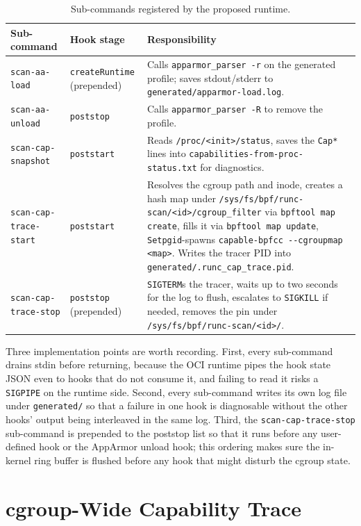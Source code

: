 \begin{table}[ht]
\centering
\caption{Sub-commands registered by the proposed runtime.}
\label{tab:subcmds}
\begin{tabular}{p{3.8cm}p{2.5cm}p{7.8cm}}
\toprule
\textbf{Sub-command} & \textbf{Hook stage} & \textbf{Responsibility} \\
\midrule
\texttt{scan-aa-load} & \texttt{createRuntime} (prepended) & Calls \texttt{apparmor\_parser -r} on the generated profile; saves stdout/stderr to \texttt{generated/apparmor-load.log}. \\
\texttt{scan-aa-unload} & \texttt{poststop} & Calls \texttt{apparmor\_parser -R} to remove the profile. \\
\texttt{scan-cap-snapshot} & \texttt{poststart} & Reads \texttt{/proc/<init>/status}, saves the \texttt{Cap*} lines into \texttt{capabilities-from-proc-status.txt} for diagnostics. \\
\texttt{scan-cap-trace-start} & \texttt{poststart} & Resolves the cgroup path and inode, creates a hash map under \texttt{/sys/fs/bpf/runc-scan/<id>/cgroup\_filter} via \texttt{bpftool map create}, fills it via \texttt{bpftool map update}, \texttt{Setpgid}-spawns \texttt{capable-bpfcc -{}-cgroupmap <map>}. Writes the tracer PID into \texttt{generated/.runc\_cap\_trace.pid}. \\
\texttt{scan-cap-trace-stop} & \texttt{poststop} (prepended) & \texttt{SIGTERM}s the tracer, waits up to two seconds for the log to flush, escalates to \texttt{SIGKILL} if needed, removes the pin under \texttt{/sys/fs/bpf/runc-scan/<id>/}. \\
\bottomrule
\end{tabular}
\end{table}

Three implementation points are worth recording. First, every sub-command drains stdin before returning, because the OCI runtime pipes the hook state JSON even to hooks that do not consume it, and failing to read it risks a \texttt{SIGPIPE} on the runtime side. Second, every sub-command writes its own log file under \texttt{generated/} so that a failure in one hook is diagnosable without the other hooks' output being interleaved in the same log. Third, the \texttt{scan-cap-trace-stop} sub-command is prepended to the poststop list so that it runs before any user-defined hook or the AppArmor unload hook; this ordering makes sure the in-kernel ring buffer is flushed before any hook that might disturb the cgroup state.

\section{cgroup-Wide Capability Trace}\label{sec:impl-cap-trace}


